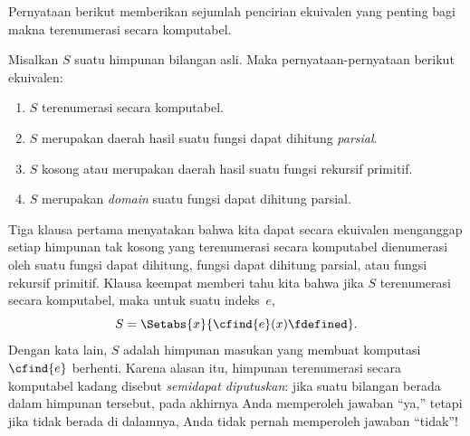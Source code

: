 \documentclass[../../../include/open-logic-section]{subfiles}
\begin{document}



Pernyataan berikut memberikan sejumlah pencirian ekuivalen yang penting bagi
makna terenumerasi secara komputabel.

\begin{thm}
Misalkan $S$ suatu himpunan bilangan asli. Maka pernyataan-pernyataan berikut
ekuivalen:
\begin{enumerate}
\item{} $S$ terenumerasi secara komputabel.
\item{} $S$ merupakan daerah hasil suatu fungsi dapat
  dihitung \emph{parsial}.
\item{} $S$ kosong atau merupakan daerah hasil suatu
  fungsi rekursif primitif.
\item{} $S$ merupakan \emph{domain} suatu fungsi dapat
  dihitung parsial.
\end{enumerate}
\end{thm}

\begin{explain}
Tiga klausa pertama menyatakan bahwa kita dapat secara ekuivalen menganggap
setiap himpunan tak kosong yang terenumerasi secara komputabel dienumerasi oleh
suatu fungsi dapat dihitung, fungsi dapat dihitung parsial, atau fungsi
rekursif primitif. Klausa keempat memberi tahu kita bahwa jika $S$
terenumerasi secara komputabel, maka untuk suatu indeks~$e$,
\[
S = \Setabs{x}{\cfind{e}(x) \fdefined}.
\]
Dengan kata lain, $S$ adalah himpunan masukan yang membuat komputasi
$\cfind{e}$ berhenti. Karena alasan itu, himpunan terenumerasi secara komputabel
kadang disebut \emph{semidapat diputuskan}: jika suatu bilangan berada dalam
himpunan tersebut, pada akhirnya Anda memperoleh jawaban ``ya,'' tetapi jika
tidak berada di dalamnya, Anda tidak pernah memperoleh jawaban ``tidak''!{}
\end{explain}
\end{document}
